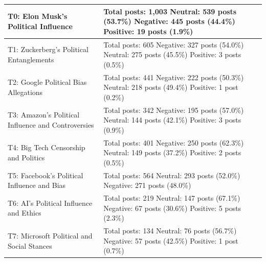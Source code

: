 \begin{longtable}{|p{6cm}|p{10cm}|}
T0: Elon Musk's Political Influence & Total posts: 1,003 \newline Neutral: 539 posts (53.7\%) \newline Negative: 445 posts (44.4\%) \newline Positive: 19 posts (1.9\%) \\
\hline
T1: Zuckerberg's Political Entanglements & Total posts: 605 \newline Negative: 327 posts (54.0\%) \newline Neutral: 275 posts (45.5\%) \newline Positive: 3 posts (0.5\%) \\
\hline
T2: Google Political Bias Allegations & Total posts: 441 \newline Negative: 222 posts (50.3\%) \newline Neutral: 218 posts (49.4\%) \newline Positive: 1 post (0.2\%) \\
\hline
T3: Amazon's Political Influence and Controversies & Total posts: 342 \newline Negative: 195 posts (57.0\%) \newline Neutral: 144 posts (42.1\%) \newline Positive: 3 posts (0.9\%) \\
\hline
T4: Big Tech Censorship and Politics & Total posts: 401 \newline Negative: 250 posts (62.3\%) \newline Neutral: 149 posts (37.2\%) \newline Positive: 2 posts (0.5\%) \\
\hline
T5: Facebook's Political Influence and Bias & Total posts: 564 \newline Neutral: 293 posts (52.0\%) \newline Negative: 271 posts (48.0\%) \\
\hline
T6: AI's Political Influence and Ethics & Total posts: 219 \newline Neutral: 147 posts (67.1\%) \newline Negative: 67 posts (30.6\%) \newline Positive: 5 posts (2.3\%) \\
\hline
T7: Microsoft Political and Social Stances & Total posts: 134 \newline Neutral: 76 posts (56.7\%) \newline Negative: 57 posts (42.5\%) \newline Positive: 1 post (0.7\%) \\

\end{longtable}
